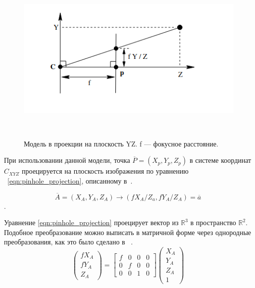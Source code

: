 \documentclass[12pt, a4paper]{article}
\begin{document}
\begin{figure}[h!]
        \includegraphics[scale=1]{images/camera_model/pinhole_visualisation_side.png}
        \caption{Модель в проекции на плоскость YZ. f --- фокусное расстояние.}
~\label{fig:pinhole_geometry}
\end{figure}

При использовании данной модели, точка $\overline{P} = (X_p, Y_p, Z_p)$ в
системе координат $C_{XYZ}$ проецируется на плоскость изображения по уравнению
~\eqref{eqn:pinhole_projection}, описанному в~\cite{multiview_cv}.

\begin{equation}
    \overline{A} = (X_A, Y_A, Z_A) \rightarrow (fX_A/Z_a, fY_A/Z_A) = \overline{a} 
~\label{eqn:pinhole_projection}
\end{equation}.

Уравнение \eqref{eqn:pinhole_projection} проецирует вектор из $\mathbb{R}^3$ в
пространство $\mathbb{R}^2$. Подобное преобразование можно выписать в матричной
форме через однородные преобразования, как это было сделано в
~\cite{multiview_cv}.
\begin{equation}
    \begin{pmatrix}
        f X_A \\
        f Y_A \\
        Z_A
    \end{pmatrix} = 
    \begin{bmatrix}
        f & 0 & 0 & 0 \\
        0 & f & 0 & 0 \\
        0 & 0 & 1 & 0
    \end{bmatrix} \begin{pmatrix}
        X_A\\
        Y_A\\
        Z_A\\
        1
    \end{pmatrix}
~\label{eqn:pinhole_matrix_projection_ideal}
\end{equation}
\end{document}
